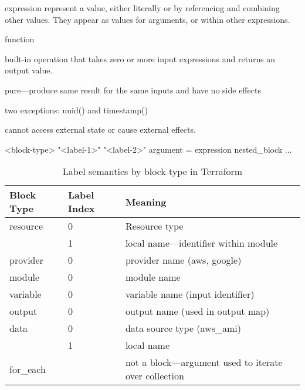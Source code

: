 \documentclass[openany, 12pt]{book}
\begin{document}
\begin{definition}{expression}{}
	represent a value, either literally or by referencing and combining other
	values. They appear as values for arguments, or within other expressions.
\end{definition}

\begin{definition}{function}{}
	\begin{alist}
		\item built-in operation that takes zero or more input expressions and
		returns an output value.
		\item pure---produce same result for the same inputs and have no side effects
		\item two exceptions: uuid() and timestamp()
		\item cannot access external state or cause external effects.
	\end{alist}
\end{definition}

\begin{shell}{}
<block-type> "<label-1>" "<label-2>" {
	argument = expression
	nested_block {
	...
	}
}
\end{shell}

\begin{table}
	\centering
	\begin{tabular}{lll}
		\toprule
		{Block Type} & {Label Index} & {Meaning}                                              \\
		\midrule
		resource     & 0             & Resource type                                          \\
		             & 1             & local name---identifier within module                  \\
		provider     & 0             & provider name (aws, google)                            \\
		module       & 0             & module name                                            \\
		variable     & 0             & variable name (input identifier)                       \\
		output       & 0             & output name (used in output map)                       \\
		data         & 0             & data source type (aws\_ami)                            \\
		             & 1             & local name                                             \\
		for\_each    &               & not a block---argument used to iterate over collection \\
		\bottomrule
	\end{tabular}
	\caption{Label semantics by block type in Terraform}
\end{table}
\end{document}
